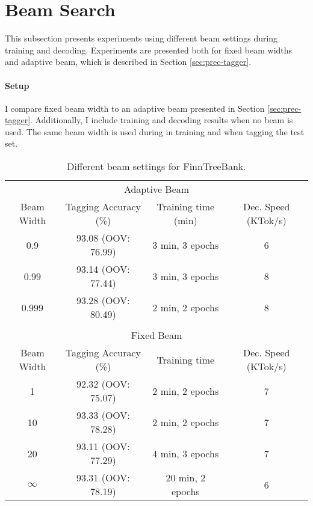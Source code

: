 \section{Beam Search}
This subsection presents experiments using different beam settings
during training and decoding. Experiments are presented both for fixed
beam widths and adaptive beam, which is described in Section
\ref{sec:prec-tagger}.

\paragraph{Setup} I compare fixed beam width to an adaptive beam
presented in Section \ref{sec:prec-tagger}. Additionally, I include
training and decoding results when no beam is used. The same beam
width is used during in training and when tagging the test set.

\begin{table}[htb!]
\begin{center}
\begin{tabular}{cccc}
\multicolumn{4}{c}{Adaptive Beam}\\
Beam Width & Tagging Accuracy (\%) & Training time (min) & Dec. Speed (KTok/s)\\
\hline
0.9        & 93.08 (OOV: 76.99)           & 3 min, 3 epochs & 6           \\
0.99       & 93.14 (OOV: 77.44)           & 3 min, 3 epochs & 8            \\
0.999      & 93.28 (OOV: 80.49)           & 2 min, 2 epochs & 8            \\
           &                  &               &               \\
\multicolumn{4}{c}{Fixed Beam}\\
Beam Width & Tagging Accuracy (\%) & Training time & Dec. Speed (KTok/s) \\
\hline
1        & 92.32 (OOV: 75.07)            & 2 min, 2 epochs & 7          \\
10       & 93.33 (OOV: 78.28)           & 2 min, 2 epochs &  7            \\
20       & 93.11 (OOV: 77.29)           & 4 min, 3 epochs &  7             \\
$\infty$ & 93.31 (OOV: 78.19)           & 20 min, 2 epochs            & 6            \\
\end{tabular}
\caption{Different beam settings for FinnTreeBank.}
\end{center}
\end{table}


